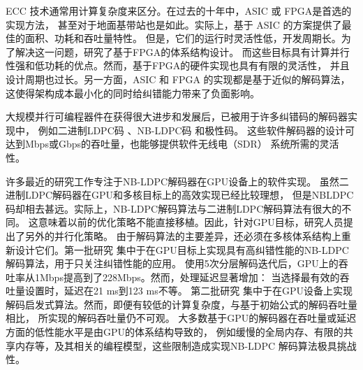 \documentclass{cjc}
\begin{document}
  ECC 技术通常用计算复杂度来区分。在过去的十年中，ASIC 或 FPGA是首选的实现方法，
  甚至对于地面基带站也是如此。实际上，基于 ASIC 的方案提供了最佳的面积、功耗和吞吐量特性。
  但是，它们的运行时灵活性低，开发周期长。为了解决这一问题，研究了基于FPGA的体系结构设计。
  而这些目标具有计算并行性强和低功耗的优点。然而，基于FPGA的硬件实现也具有有限的灵活性，
  并且设计周期也过长。另一方面，ASIC 和 FPGA 的实现都是基于近似的解码算法，
  这使得架构成本最小化的同时给纠错能力带来了负面影响。

  大规模并行可编程器件在获得很大进步和发展后，已被用于许多纠错码的解码器实现中，
  例如二进制LDPC码\cite{chang_accelerating_2011,falcao_portable_2012,noauthor_wang_nodate-1,li_efficient_2013,lin_high_2014,gal_high-throughput_2016,andrade_survey_2016}
  、NB-LDPC码\cite{noauthor_wang_nodate,noauthor_andrade_nodate,noauthor_beermann_nodate,andrade_optimized_2014,noauthor_thi_nodate,beermann_gpu_2015,noauthor_pham_nodate,liu_high-throughput_2018}
  和极性码\cite{noauthor_gal_nodate,gal_multi-gbs_2015,giard_low-latency_2018}。
  这些软件解码器的设计可达到Mbps或Gbps的吞吐量，也能够提供软件无线电（SDR）\cite{grayver_implementing_2013}
  系统所需的灵活性。

  许多最近的研究工作专注于NB-LDPC解码器在GPU设备上的软件实现\cite{noauthor_wang_nodate,noauthor_andrade_nodate,noauthor_beermann_nodate,andrade_optimized_2014,noauthor_thi_nodate,beermann_gpu_2015,noauthor_pham_nodate,liu_high-throughput_2018}。
  虽然二进制LDPC解码器在GPU和多核目标上的高效实现已经比较理想\cite{chang_accelerating_2011,falcao_portable_2012,noauthor_wang_nodate-1,li_efficient_2013,lin_high_2014,gal_high-throughput_2016,andrade_survey_2016}，
  但是NBLDPC码却相去甚远。实际上，NB-LDPC解码算法与二进制LDPC解码算法有很大的不同。
  这意味着以前的优化策略不能直接移植。因此，针对GPU目标，研究人员提出了另外的并行化策略。
  由于解码算法的主要差异，还必须在多核体系结构上重新设计它们。第一批研究\cite{noauthor_andrade_nodate,noauthor_beermann_nodate,andrade_optimized_2014,beermann_gpu_2015,liu_high-throughput_2018}
  集中于在GPU目标上实现具有高纠错性能的NB-LDPC解码算法，用于只关注纠错性能的应用。
  使用5次分层解码迭代后，GPU上的吞吐率从1Mbps提高到了228Mbps。然而，处理延迟显著增加：
  当选择最有效的吞吐量设置时，延迟在21 ms到123 ms不等\cite{liu_high-throughput_2018}。
  第二批研究\cite{noauthor_wang_nodate,noauthor_thi_nodate,noauthor_pham_nodate}
  集中于在GPU设备上实现解码启发式算法。然而，即便有较低的计算复杂度，与基于初始公式的解码吞吐量相比，
  所实现的解码吞吐量仍不可观\cite{noauthor_andrade_nodate,liu_high-throughput_2018}。
  大多数基于GPU的解码器在吞吐量或延迟方面的低性能水平是由GPU的体系结构导致的，
  例如缓慢的全局内存、有限的共享内存等，及其相关的编程模型，这些限制造成实现NB-LDPC
  解码算法极具挑战性。
\end{document}
